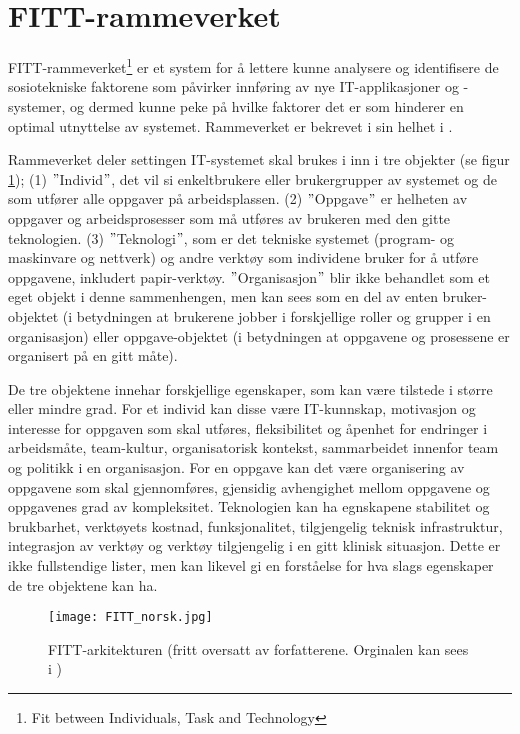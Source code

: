\section{FITT-rammeverket}
\label{sec:fitt-rammeverket}

FITT-rammeverket\footnote{Fit between Individuals, Task and Technology} er et system for å lettere kunne analysere og identifisere de sosiotekniske faktorene som påvirker innføring av nye IT-applikasjoner og -systemer, og dermed kunne peke på hvilke faktorer det er som hinderer en optimal utnyttelse av systemet. Rammeverket er bekrevet i sin helhet i \citep{FITT}.

\noindent
Rammeverket deler settingen IT-systemet skal brukes i inn i tre objekter (se figur \ref{FITT-arkitekturen}); (1) $"$Individ$"$, det vil si enkeltbrukere eller brukergrupper av systemet og de som utfører alle oppgaver på arbeidsplassen. (2) $"$Oppgave$"$ er helheten av oppgaver og arbeidsprosesser som må utføres av brukeren med den gitte teknologien. (3) $"$Teknologi$"$, som er det tekniske systemet (program- og maskinvare og nettverk) og andre verktøy som individene bruker for å utføre oppgavene, inkludert papir-verktøy.
$"$Organisasjon$"$ blir ikke behandlet som et eget objekt i denne sammenhengen, men kan sees som en del av enten bruker-objektet (i betydningen at brukerene jobber i forskjellige roller og grupper i en organisasjon) eller oppgave-objektet (i betydningen at oppgavene og prosessene er organisert på en gitt måte).

\noindent
De tre objektene innehar forskjellige egenskaper, som kan være tilstede i større eller mindre grad. For et individ kan disse være IT-kunnskap, motivasjon og interesse for oppgaven som skal utføres, fleksibilitet og åpenhet for endringer i arbeidsmåte, team-kultur, organisatorisk kontekst, sammarbeidet innenfor team og politikk i en organisasjon. For en oppgave kan det være organisering av oppgavene som skal gjennomføres, gjensidig avhengighet mellom oppgavene og oppgavenes grad av kompleksitet. Teknologien kan ha egnskapene stabilitet og brukbarhet, verktøyets kostnad, funksjonalitet, tilgjengelig teknisk infrastruktur, integrasjon av verktøy og verktøy tilgjengelig i en gitt klinisk situasjon. Dette er ikke fullstendige lister, men kan likevel gi en forståelse for hva slags egenskaper de tre objektene kan ha.

\begin{figure}[H]
\centering
\texttt{[image: FITT\_norsk.jpg]}
\caption{FITT-arkitekturen (fritt oversatt av forfatterene. Orginalen kan sees i \citep{FITT})}
\label{FITT-arkitekturen}
\end{figure}

